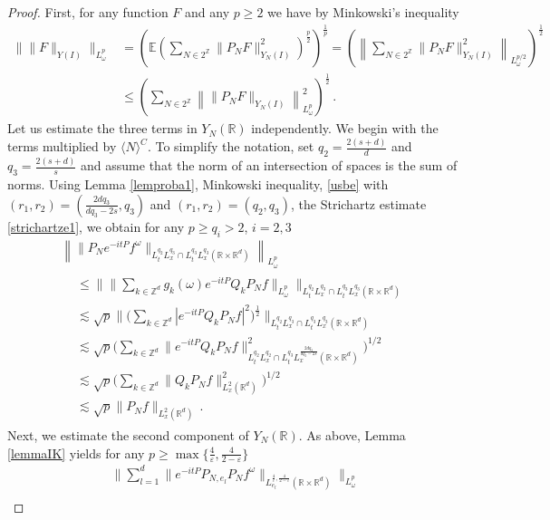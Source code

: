 \documentclass[10pt,leqno]{amsart}
\newcommand{\R}{\mathbb{R}}
\numberwithin{equation}{section}
\newcommand{\Z}{\mathbb{Z}}
\begin{document}
\begin{proof}
First, for any function $F$ and any $p \geq 2$ we have by Minkowski's inequality 
\begin{align*}
\|\|F \|_{Y(I)} \|_{L_\omega^p} &=  \left(\mathbb{E}\left(\sum_{N \in 2^\Z} \|P_N F\|_{Y_N(I)}^2 \right)^{\frac{p}{2}}\right)^{\frac{1}{p}} = 
\left( \left\|\sum_{N \in 2^\Z} \|P_N F\|_{Y_N(I)}^2 \right\|_{L_\omega^{p/2 }} \right)^{\frac{1}{2}} \\
&\leq 
\left(\sum_{N \in 2^\Z} \left\| \|P_NF\|_{Y_N(I)} \right\|_{L_\omega^{p }}^2 \right)^{\frac{1}{2}} \,.
\end{align*}
Let us estimate the three terms in $Y_N(\R)$ independently. We begin with the terms multiplied by $\langle N \rangle^C$. To simplify the notation,  set $q_2=\frac{2(s+d)}{d}$ and $q_3=\frac{2(s+d)}{s}$
and assume that the norm of an intersection of spaces is the sum of norms.  Using Lemma \ref{lemproba1},
Minkowski inequality, \eqref{usbe} with $(r_1, r_2) = (\frac{2dq_3 }{dq_3 -2s}, q_3)$ and $(r_1, r_2) = (q_2, q_3)$, the Strichartz estimate \eqref{strichartze1}, we obtain for any $p \geq q_i > 2$, $i = 2, 3$
\begin{multline*}
\left\|\|P_{N}e^{-it P} f^\omega \|_{L_t^{q_2} L_x^{q_3} \cap L_t^{q_3} L_x^{q_3} (\R \times \R^d) }  \right\|_{L_\omega^p}\\
\begin{aligned}
&\leq \Big\|  \Big\| \sum_{k \in \Z^d} g_k (\omega) e^{-it P}  Q_k P_N f \Big\|_{L_\omega^p} \Big\|_{L_t^{q_2} L_x^{q_3} \cap L_t^{q_3} L_x^{q_3} (\R \times \R^d) } \\
&\lesssim \sqrt{p} \Big\| \Big( \sum_{k \in \Z^d}  |e^{-it P}  Q_k  P_N f|^2 \Big)^{\frac{1}{2}}  \Big\|_{L_t^{q_2} L_x^{q_3} \cap L_t^{q_3} L_x^{q_3} (\R\times \R^d) } \\
&\lesssim  \sqrt{p} \Big( \sum_{k \in \Z^d} \| e^{-it P}  Q_k P_N f  \|^2_{L_t^{q_2} L_x^{q_2} \cap L_t^{q_3} L_x^{\frac{2dq_3 }{dq_3 -2s}} (\R \times \R^d)}  \Big)^{1/2}\\
&\lesssim   \sqrt{p} \Big( \sum_{k \in \Z^d} \|  Q_k P_N f  \|^2_{L_x^2 (\R^d) } \Big)^{1/2}\\
&\lesssim \sqrt{p} \|P_N f\|_{L_x^2 (\R^d)} \,.
\end{aligned}
\end{multline*}
Next, we estimate the second component of $Y_N (\R)$.  As above, Lemma \ref{lemmaIK} yields for any $p \geq \max\{\frac{4}{\varepsilon}, \frac{4}{2 - \varepsilon}\}$
\begin{multline*}
\bigg\|\sum_{l=1}^d \|e^{-it P} P_{N,e_l} P_N f^\omega \|_{L^{\frac{4}{\varepsilon},\frac{4}{2-\varepsilon}}_{e_l} (\R\times \R^d)} \bigg\|_{L_\omega^p}  \\

\end{multline*}
\end{proof}
\end{document}
